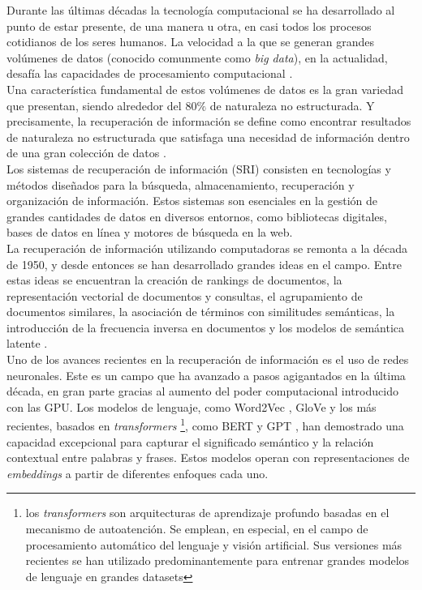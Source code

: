 Durante las últimas décadas la tecnología computacional se ha desarrollado al punto de estar presente, de una manera u otra, en casi todos los procesos cotidianos de los seres humanos. La velocidad a la que se generan grandes volúmenes de datos (conocido comunmente como \textit{big data}), en la actualidad, desafía las capacidades de procesamiento computacional \cite{RiseofBigData}.\\
Una característica fundamental de estos volúmenes de datos es la gran variedad que presentan, siendo alrededor del 80$\%$ de naturaleza no estructurada. Y precisamente, la recuperación de información se define como encontrar resultados de naturaleza no estructurada que satisfaga una necesidad de información dentro de una gran colección de datos \cite{manning2008introductiontoIR}.\\
Los sistemas de recuperación de información (SRI) consisten en tecnologías y métodos diseñados para la búsqueda, almacenamiento, recuperación y organización de información. Estos sistemas son esenciales en la gestión de grandes cantidades de datos en diversos entornos, como bibliotecas digitales, bases de datos en línea y motores de búsqueda en la web.\\ 
La recuperación de información utilizando computadoras  se remonta a la década de 1950, y desde entonces se han desarrollado grandes ideas en el campo. Entre estas ideas se encuentran la creación de rankings de documentos, la representación vectorial de documentos y consultas, el agrupamiento de documentos similares, la asociación de términos con similitudes semánticas, la introducción de la frecuencia inversa en documentos y los modelos de semántica latente \cite{SRIConf1}.\\
Uno de los avances recientes en la recuperación de información es el uso de redes neuronales. Este es un campo que ha avanzado a pasos agigantados en la última década, en gran parte gracias al aumento del poder computacional introducido con las GPU. Los modelos de lenguaje, como Word2Vec \cite{Mikolov2013EfficientEO}, GloVe \cite{Pennington2014GloVeGV} y los más recientes, basados en \textit{transformers} \footnote{los \textit{transformers} son arquitecturas de aprendizaje profundo basadas en el mecanismo de autoatención. Se emplean, en especial, en el campo de procesamiento automático del lenguaje y visión artificial. Sus versiones más recientes se han utilizado predominantemente para entrenar grandes modelos de lenguaje en grandes datasets}, como BERT \cite{Devlin2019BERTPO} y GPT \cite{Radford2018ImprovingLU}, han demostrado una capacidad excepcional para capturar el significado semántico y la relación contextual entre palabras y frases. Estos modelos operan con representaciones de \textit{embeddings} a partir de diferentes enfoques cada uno.\\
